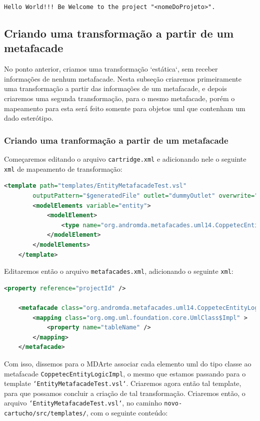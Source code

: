 \texttt{Hello World!!! Be Welcome to the project "<nomeDoProjeto>".}

\subsection{Criando uma transformação a partir de um metafacade}
No ponto anterior, criamos uma transformação `estática`, sem receber informações
de nenhum metafacade. Nesta subseção criaremos primeiramente uma transformação a
partir das informações de um metafacade, e depois criaremos uma segunda
transformação, para o mesmo metafacade, porém o mapeamento para esta será feito
somente para objetos uml que contenham um dado esterótipo.

\subsubsection{Criando uma tranformação a partir de um metafacade}
Começaremos editando o arquivo \texttt{cartridge.xml} e adicionando nele o
seguinte \texttt{xml} de mapeamento de transformação:

\begin{lstlisting}[language=xml]
	<template path="templates/EntityMetafacadeTest.vsl"
		outputPattern="$generatedFile" outlet="dummyOutlet" overwrite="true">
		<modelElements variable="entity">
            <modelElement>
                <type name="org.andromda.metafacades.uml14.CoppetecEntityLogicImpl" />
            </modelElement>
        </modelElements>
	</template>
\end{lstlisting}

Editaremos então o arquivo \texttt{metafacades.xml}, adicionando o seguinte
\texttt{xml}:

\begin{lstlisting}[language=xml]
    <property reference="projectId" />
	
    <metafacade class="org.andromda.metafacades.uml14.CoppetecEntityLogicImpl">
        <mapping class="org.omg.uml.foundation.core.UmlClass$Impl" >
        	<property name="tableName" />
        </mapping>
    </metafacade>
\end{lstlisting}

Com isso, dissemos para o MDArte associar cada elemento uml do tipo classe ao
metafacade \texttt{CoppetecEntityLogicImpl}, o mesmo que estamos passando para o
template \texttt{`EntityMetafacadeTest.vsl`}. Criaremos agora então tal
template, para que possamos concluir a criação de tal transformação. Criaremos
então, o arquivo \texttt{`EntityMetafacadeTest.vsl`}, no caminho
\texttt{novo-cartucho/src/templates/}, com o seguinte conteúdo:

